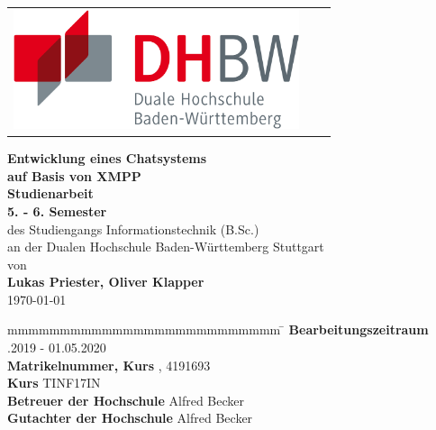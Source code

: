 \documentclass[a4paper,titlepage,halfparskip,12pt]{scrreprt}
\newcommand{\titel}{Entwicklung eines Chatsystems\\auf Basis von XMPP}
\begin{document}
\begin{table}[h]
\centering
\begin{tabular}{lcr}
\includegraphics[height=3.5cm]{images/dhbw-logo}
\end{tabular}
\end{table}
\bigskip
\bigskip
\begin{center}
\vspace*{12mm} {\LARGE\textbf{\titel}}\\
\vspace*{12mm} {\large\textbf{Studienarbeit}}\\
\vspace*{3mm} {\large\textbf{5. - 6. Semester}}\\
\vspace*{12mm} des Studiengangs Informationstechnik (B.Sc.)\\ an der Dualen Hochschule Baden-Württemberg Stuttgart\\
\vspace*{12mm} von\\
\vspace*{3mm} {\large\textbf{Lukas Priester, Oliver Klapper}}\\
\vspace*{12mm} \today\\
\end{center}
\vfill
\begin{spacing}{1.5}
\begin{tabbing}
mmmmmmmmmmmmmmmmmmmmmmmmmm \= \kill
\textbf{Bearbeitungszeitraum} .2019 - 01.05.2020\\
\textbf{Matrikelnummer, Kurs} , 4191693 \\
\textbf{Kurs} \> TINF17IN\\
\textbf{Betreuer der Hochschule} \> Alfred Becker\\
\textbf{Gutachter der Hochschule} \> Alfred Becker\\
\end{tabbing}
\end{spacing}
\newpage
\end{document}
